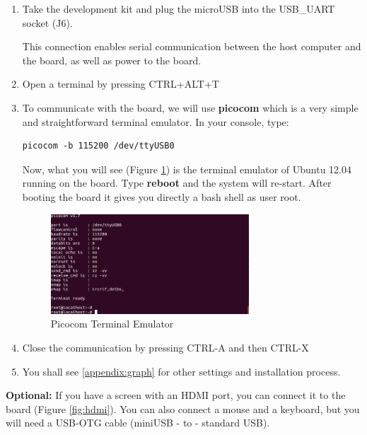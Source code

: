 \begin{enumerate}
    \item Take the development kit and plug the microUSB into the USB\_UART socket (J6).  

    This connection enables serial communication between the host computer and the board, as well as power to the board.
    
    \item Open a terminal by pressing CTRL+ALT+T
    \item To communicate with the board, we will use \textbf{picocom} which is a very simple and straightforward terminal emulator. In your console, type:
        \begin{tcolorbox}
        \begin{verbatim}
picocom -b 115200 /dev/ttyUSB0
        \end{verbatim}
        \end{tcolorbox}

    Now, what you will see (Figure \ref{fig:picocom}) is the terminal emulator of Ubuntu 12.04 running on the board.
    Type \textbf{reboot} and the system will re-start. After booting the board it gives you directly a bash shell as user root.


    \begin{figure}[h!]
    \centering
    \includegraphics[width=0.7\textwidth]{img/picocom.png}
    \caption{Picocom Terminal Emulator}
    \label{fig:picocom}
\end{figure}


    \item Close the communication by pressing CTRL-A and then CTRL-X

    \item You shall see  \cref{appendix:graph} for other settings and installation process.
\end{enumerate}

{\color{red} \textbf{Optional:}} If you have a screen with an HDMI port, you can connect it to the board (Figure \ref{fig:hdmi}). You can also connect a mouse and a keyboard, but you will need a USB-OTG cable (miniUSB - to - standard USB).



